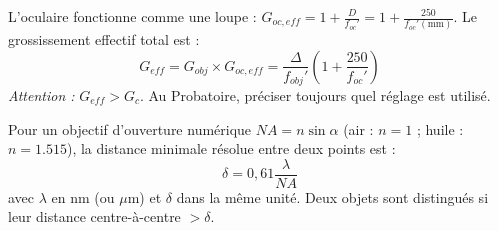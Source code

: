 \documentclass[11pt]{article}
\begin{document}
\begin{propriete}[Grossissement effectif -- Réglage Confort (image au point proche $D=\SI{250}{\mm}$)]
L'oculaire fonctionne comme une loupe : $G_{oc,eff} = 1 + \frac{D}{f_{oc}'} = 1 + \frac{250}{f_{oc}'(\text{mm})}$.
Le grossissement effectif total est :
\[ G_{eff} = G_{obj} \times G_{oc,eff} = \frac{\Delta}{f_{obj}'} \left(1 + \frac{250}{f_{oc}'}\right) \]
\emph{Attention :} $G_{eff} > G_c$. Au Probatoire, préciser toujours quel réglage est utilisé.
\end{propriete}

\begin{propriete}
Pour un objectif d'ouverture numérique $NA = n \sin \alpha$ (air : $n=1$ ; huile : $n=\num{1,515}$), la distance minimale résolue entre deux points est :
\[ \delta = 0,61 \frac{\lambda}{NA} \]
avec $\lambda$ en $\text{nm}$ (ou $\mu\text{m}$) et $\delta$ dans la même unité.
Deux objets sont distingués si leur distance centre-à-centre $> \delta$.
\end{propriete}
\end{document}
